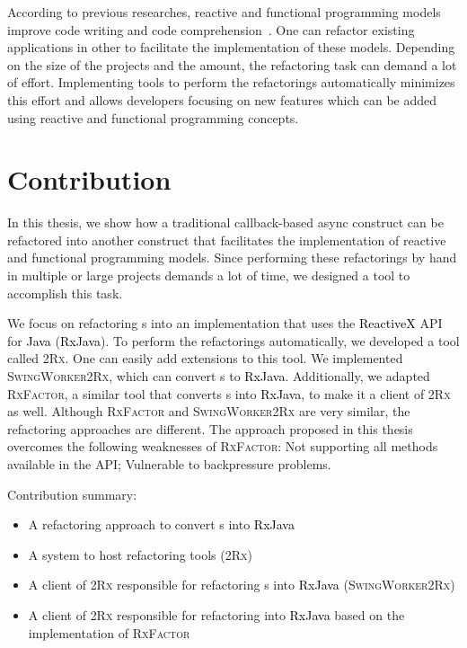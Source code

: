 \documentclass[type=bsc,accentcolor=tud9c]{tudthesis}
\newcommand{\framework}[1]{\textcolor{black}{#1}}
\newcommand{\toolcore}{\textsc{2Rx}}
\newcommand{\toolextension}{\textsc{SwingWorker2Rx}}
\begin{document}
According to previous researches, reactive and functional programming models improve code writing and code comprehension~\cite{promises, paperReactiveComprehension}. One can refactor existing applications in other to facilitate the implementation of these models. Depending on the size of the projects and the amount, the refactoring task can demand a lot of effort. Implementing tools to perform the refactorings automatically minimizes this effort and allows developers focusing on new features which can be added using reactive and functional programming concepts.

\section{Contribution}

In this thesis, we show how a traditional callback-based async construct can be refactored into another construct that facilitates the implementation of reactive and functional programming models. Since performing these refactorings by hand in multiple or large projects demands a lot of time, we designed a tool to accomplish this task.

We focus on refactoring s into an implementation that uses the \framework{ReactiveX} API for \framework{Java} (\framework{RxJava}). To perform the refactorings automatically, we developed a tool called \toolcore{}. One can easily add extensions to this tool. We implemented \toolextension{}, which can convert s to \framework{RxJava}. Additionally, we adapted \textsc{RxFactor}, a similar tool that converts s into \framework{RxJava}, to make it a client of \toolcore{} as well. Although \textsc{RxFactor} and \toolextension{} are very similar, the refactoring approaches are different. The approach proposed in this thesis overcomes the following weaknesses of \textsc{RxFactor}: Not supporting all methods available in the  API; Vulnerable to backpressure problems.

Contribution summary:
\begin{itemize}
	\item A refactoring approach to convert s into \framework{RxJava}
	\item A system to host refactoring tools (\toolcore{})
	\item A client of \toolcore{} responsible for refactoring s into \framework{RxJava} (\toolextension{})
	\item A client of \toolcore{} responsible for refactoring  into \framework{RxJava} based on the implementation of \textsc{RxFactor}
\end{itemize}
\end{document}
